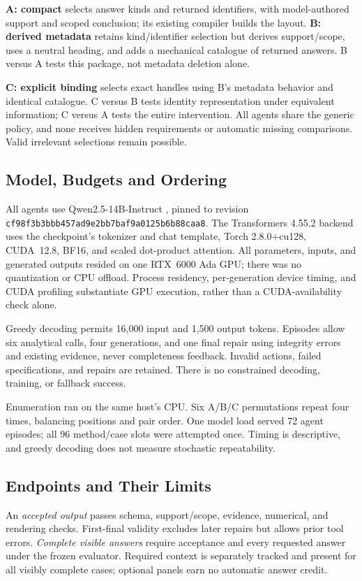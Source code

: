 \textbf{A: compact} selects answer kinds and returned identifiers, with model-authored support and scoped conclusion; its existing compiler builds the layout. \textbf{B: derived metadata} retains kind/identifier selection but derives support/scope, uses a neutral heading, and adds a mechanical catalogue of returned answers. B versus A tests this package, not metadata deletion alone.

\textbf{C: explicit binding} selects exact handles using B's metadata behavior and identical catalogue. C versus B tests identity representation under equivalent information; C versus A tests the entire intervention. All agents share the generic policy, and none receives hidden requirements or automatic missing comparisons. Valid irrelevant selections remain possible.

\subsection{Model, Budgets and Ordering}
All agents use Qwen2.5-14B-Instruct \cite{qwenReport,qwenCheckpoint}, pinned to revision \texttt{cf98f3b3bbb457ad9e2bb}\allowbreak\texttt{7baf9a0125b6b88caa8}. The Transformers 4.55.2 backend uses the checkpoint's tokenizer and chat template, Torch 2.8.0+cu128, CUDA~12.8, BF16, and scaled dot-product attention. All parameters, inputs, and generated outputs resided on one RTX~6000 Ada GPU; there was no quantization or CPU offload. Process residency, per-generation device timing, and CUDA profiling substantiate GPU execution, rather than a CUDA-availability check alone.

Greedy decoding permits 16,000 input and 1,500 output tokens. Episodes allow six analytical calls, four generations, and one final repair using integrity errors and existing evidence, never completeness feedback. Invalid actions, failed specifications, and repairs are retained. There is no constrained decoding, training, or fallback success.

Enumeration ran on the same host's CPU. Six A/B/C permutations repeat four times, balancing positions and pair order. One model load served 72 agent episodes; all 96 method/case slots were attempted once. Timing is descriptive, and greedy decoding does not measure stochastic repeatability.

\subsection{Endpoints and Their Limits}
An \emph{accepted output} passes schema, support/scope, evidence, numerical, and rendering checks. First-final validity excludes later repairs but allows prior tool errors. \emph{Complete visible answers} require acceptance and every requested answer under the frozen evaluator. Required context is separately tracked and present for all visibly complete cases; optional panels earn no automatic answer credit.

